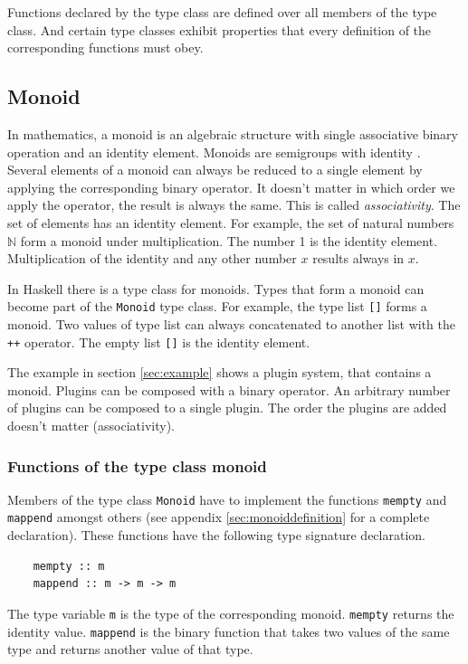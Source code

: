 Functions declared by the type class are defined over all members of the type class. And certain type classes exhibit properties that every definition of the corresponding functions must obey.

\subsection{Monoid}
\label{sec:monoid}

In mathematics, a \gls{monoid} is an algebraic structure with single associative binary operation and an identity element. Monoids are semigroups with identity \cite{wiki:monoid} \cite{renshaw}. Several elements of a monoid can always be reduced to a single element by applying the corresponding binary operator. It doesn't matter in which order we apply the operator, the result is always the same. This is called \emph{\gls{associativity}}. The set of elements has an identity element. For example, the set of natural numbers $\mathbb{N}$ form a monoid under multiplication.  The number 1 is the identity element. Multiplication of the identity and any other number $x$ results always in $x$.

In Haskell there is a type class for monoids. Types that form a monoid can become part of the \verb|Monoid| type class. For example, the type list \verb|[]| forms a monoid. Two values of type list can always concatenated to another list with the \verb|++| operator. The empty list \verb|[]| is the identity element. 

The example in section \ref{sec:example} shows a plugin system, that contains a monoid. Plugins can be composed with a binary operator. An arbitrary number of plugins can be composed to a single plugin. The order the plugins are added doesn't matter (\gls{associativity}). 

\subsubsection{Functions of the type class monoid}

Members of the type class \verb|Monoid| have to implement the functions \verb|mempty| and \verb|mappend| amongst others (see appendix \ref{sec:monoiddefinition} for a complete declaration).
These functions have the following type signature declaration.
\begin{verbatim}
    mempty :: m
    mappend :: m -> m -> m
\end{verbatim}
The type variable \verb|m| is the type of the corresponding monoid.
\verb|mempty| returns the identity value. \verb|mappend| is the binary function that takes two values of the same type and returns another value of that type. 

